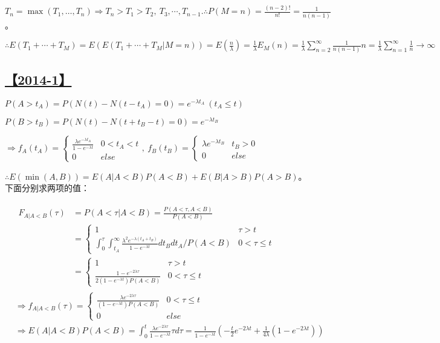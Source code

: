 $T_n=\max(T_1, \dots, T_n)\Rightarrow T_n>T_1>T_2,\ T_3,\cdots, T_{n-1}. \therefore P(M=n)=\frac{(n-2)!}{n!}=\frac{1}{n(n-1)}$。

$\therefore E(T_1+\cdots+T_M)=E(E(T_1+\cdots+T_M|M=n))=E(\frac{n}{\lambda})=\frac{1}{\lambda}E_M(n)=\frac{1}{\lambda}\sum_{n=2}^\infty\frac{1}{n(n-1)}n=\frac{1}{\lambda}\sum_{n=1}^\infty\frac{1}{n}\rightarrow\infty$

\subsection{\hyperref[Q2014-1]{【2014-1】}}\label{A2014-1}

$P(A>t_A)=P(N(t)-N(t-t_A)=0)=e^{-\lambda t_A}\ (t_A\le t)$

$P(B>t_B)=P(N(t)-N(t+t_B-t)=0)=e^{-\lambda t_B}$

$\Rightarrow f_A(t_A)=\begin{cases}\frac{\lambda e^{-\lambda t_A}}{1-e^{-\lambda t}} & 0<t_A<t\\0 & else\end{cases},\ f_B(t_B)=\begin{cases}\lambda e^{-\lambda t_B} & t_B>0\\0 & else\end{cases}$

$\therefore E(\min(A, B))=E(A|A<B)P(A<B)+E(B|A>B)P(A>B)$。下面分别求两项的值：

\begin{equation}\tag*{}
\begin{split}&
\begin{split}
F_{A|A<B}(\tau)&=P(A<\tau|A<B)=\frac{P(A<\tau, A<B)}{P(A<B)}\\&=
\begin{cases}
1 & \tau>t\\\int_0^\tau\int_{t_A}^\infty\frac{\lambda^2e^{-\lambda(t_A+t_B)}}{1-e^{-\lambda t}}dt_Bdt_A/P(A<B) & 0<\tau\le t
\end{cases}\\
&=\begin{cases}
1 & \tau>t\\\frac{1-e^{-2\lambda \tau}}{2(1-e^{-\lambda t})P(A<B)} & 0<\tau\le t
\end{cases}
\end{split}\\
&\Rightarrow f_{A|A<B}(\tau)=\begin{cases}\frac{\lambda e^{-2\lambda \tau}}{(1-e^{-\lambda t})P(A<B)} & 0<\tau\le t\\0&else\end{cases}\\
&\Rightarrow E(A|A<B)P(A<B)=\int_0^t\frac{\lambda e^{-2\lambda \tau}}{1-e^{-\lambda t}}\tau d\tau=\frac{1}{1-e^{-\lambda t}}\left(-\frac{t}{2}e^{-2\lambda t}+\frac{1}{4\lambda}(1-e^{-2\lambda t})\right)
\end{split}
\end{equation}

